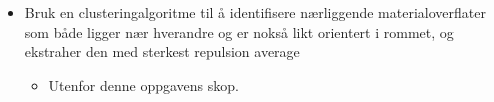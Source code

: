 \begin{framed}
\begin{itemize}
\begin{itemize}
\begin{itemize}
                    \end{itemize}
            \end{itemize}
            \item Bruk en clusteringalgoritme til å identifisere nærliggende
                materialoverflater som både ligger nær hverandre og er nokså
                likt orientert i rommet, og ekstraher den med sterkest
                repulsion average
                \begin{itemize}
                    \item Utenfor denne oppgavens skop.
                \end{itemize}
    \end{itemize}
\end{framed}

